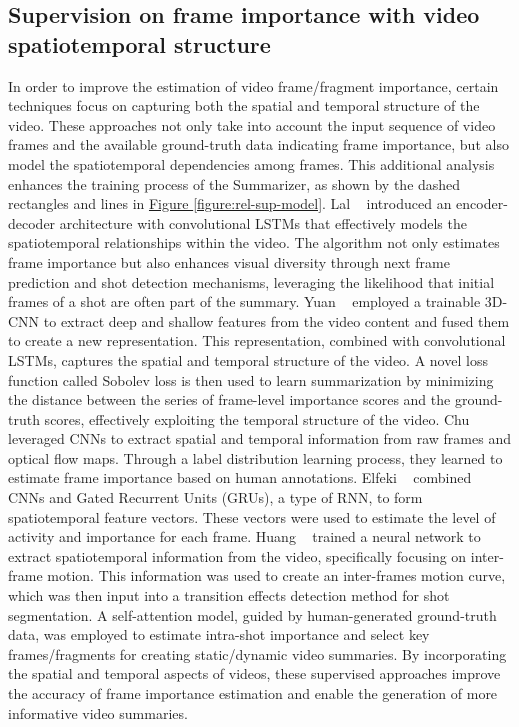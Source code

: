 \subsection{Supervision on frame importance with video spatiotemporal structure}
\label{subsec:rel-sup-spatiotemporal}

In order to improve the estimation of video frame/fragment importance, certain techniques focus on capturing both the spatial and temporal structure of the video. These approaches not only take into account the input sequence of video frames and the available ground-truth data indicating frame importance, but also model the spatiotemporal dependencies among frames. This additional analysis enhances the training process of the Summarizer, as shown by the dashed rectangles and lines in \hyperref[figure:rel-sup-model]{Figure \ref{figure:rel-sup-model}}. Lal \etal~\cite{lal2019online} introduced an encoder-decoder architecture with convolutional LSTMs that effectively models the spatiotemporal relationships within the video. The algorithm not only estimates frame importance but also enhances visual diversity through next frame prediction and shot detection mechanisms, leveraging the likelihood that initial frames of a shot are often part of the summary. Yuan \etal~\cite{yuan2019spatiotemporal} employed a trainable 3D-CNN to extract deep and shallow features from the video content and fused them to create a new representation. This representation, combined with convolutional LSTMs, captures the spatial and temporal structure of the video. A novel loss function called Sobolev loss is then used to learn summarization by minimizing the distance between the series of frame-level importance scores and the ground-truth scores, effectively exploiting the temporal structure of the video. Chu \etal~\cite{chu2019spatiotemporal} leveraged CNNs to extract spatial and temporal information from raw frames and optical flow maps. Through a label distribution learning process, they learned to estimate frame importance based on human annotations.  Elfeki \etal~\cite{elfeki2019video} combined CNNs and Gated Recurrent Units (GRUs), a type of RNN, to form spatiotemporal feature vectors. These vectors were used to estimate the level of activity and importance for each frame. Huang \etal~\cite{huang2019novel} trained a neural network to extract spatiotemporal information from the video, specifically focusing on inter-frame motion. This information was used to create an inter-frames motion curve, which was then input into a transition effects detection method for shot segmentation. A self-attention model, guided by human-generated ground-truth data, was employed to estimate intra-shot importance and select key frames/fragments for creating static/dynamic video summaries. By incorporating the spatial and temporal aspects of videos, these supervised approaches improve the accuracy of frame importance estimation and enable the generation of more informative video summaries.
